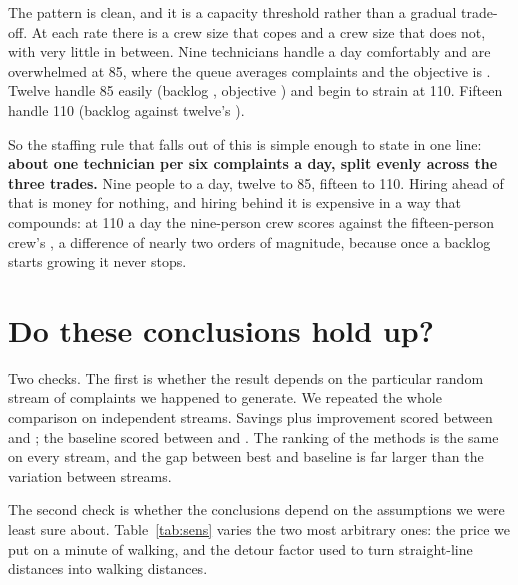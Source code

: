 \documentclass[11pt]{article}
\newcommand{\num}[1]{#1}
\begin{document}
\begin{table}[h]\centering\small

\caption{Crew size against complaint rate, all running the best method. The
objective column is what matters: it rises by a factor of a hundred when a
crew is past its capacity, because the backlog compounds.}
\label{tab:grid}
\end{table}

The pattern is clean, and it is a capacity threshold rather than a gradual
trade-off. At each rate there is a crew size that copes and a crew size that
does not, with very little in between. Nine technicians handle
\NTicketsPerDay{} a day comfortably and are overwhelmed at \num{85}, where
the queue averages \NGridEightyFivexThreeBacklog{} complaints and the
objective is \NGridEightyFivexThreeObj. Twelve handle \num{85} easily
(backlog \NGridEightyFivexFourBacklog, objective
\NGridEightyFivexFourObj) and begin to strain at \num{110}. Fifteen handle
\num{110} (backlog \NGridOneHundredTenxFiveBacklog{} against twelve's
\NGridOneHundredTenxFourBacklog).

So the staffing rule that falls out of this is simple enough to state in one
line: \textbf{about one technician per six complaints a day, split evenly
across the three trades.} Nine people to \NTicketsPerDay{} a day, twelve to
\num{85}, fifteen to \num{110}. Hiring ahead of that is money for nothing,
and hiring behind it is expensive in a way that compounds: at \num{110} a day
the nine-person crew scores \NGridOneHundredTenxThreeObj{} against the
fifteen-person crew's \NGridOneHundredTenxFiveObj, a difference of nearly two
orders of magnitude, because once a backlog starts growing it never stops.

\section{Do these conclusions hold up?}

Two checks. The first is whether the result depends on the particular random
stream of complaints we happened to generate. We repeated the whole comparison
on \NSeedCount{} independent streams. Savings plus improvement scored between
\NSeedImpMin{} and \NSeedImpMax; the baseline scored between \NSeedFifoMin{}
and \NSeedFifoMax. The ranking of the methods is the same on every stream, and
the gap between best and baseline is far larger than the variation between
streams.

The second check is whether the conclusions depend on the assumptions we were
least sure about. Table~\ref{tab:sens} varies the two most arbitrary ones: the
price we put on a minute of walking, and the detour factor used to turn
straight-line distances into walking distances.
\end{document}

